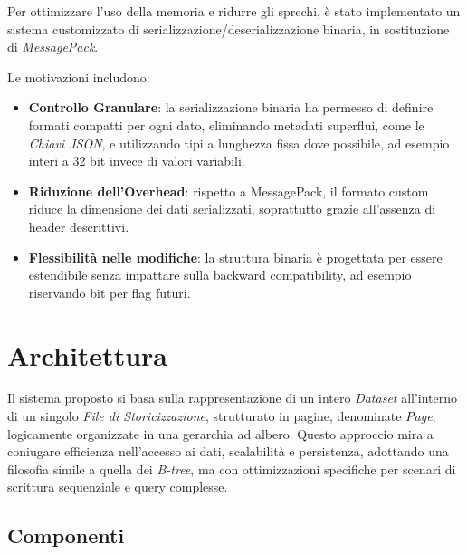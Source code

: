 \documentclass[12pt,a4paper,openright,twoside]{book}
\begin{document}
        Per ottimizzare l’uso della memoria e ridurre gli sprechi, è stato implementato un sistema customizzato di serializzazione/deserializzazione binaria, in sostituzione di \textit{MessagePack}.

        Le motivazioni includono:
        \begin{itemize}
            \item \textbf{Controllo Granulare}: la serializzazione binaria ha permesso di definire formati compatti per ogni dato, eliminando metadati superflui, come le \textit{Chiavi JSON}, e utilizzando tipi a lunghezza fissa dove possibile, ad esempio interi a 32 bit invece di valori variabili.
            \item \textbf{Riduzione dell’Overhead}: rispetto a MessagePack, il formato custom riduce la dimensione dei dati serializzati, soprattutto grazie all’assenza di header descrittivi.
            \item \textbf{Flessibilità nelle modifiche}: la struttura binaria è progettata per essere estendibile senza impattare sulla backward compatibility, ad esempio riservando bit per flag futuri.
        \end{itemize}

    \section{Architettura}

        Il sistema proposto si basa sulla rappresentazione di un intero \textit{Dataset} all’interno di un singolo \textit{File di Storicizzazione}, strutturato in pagine, denominate \textit{Page}, logicamente organizzate in una gerarchia ad albero. Questo approccio mira a coniugare efficienza nell’accesso ai dati, scalabilità e persistenza, adottando una filosofia simile a quella dei \textit{B-tree}, ma con ottimizzazioni specifiche per scenari di scrittura sequenziale e query complesse.

        \subsection{Componenti}
\end{document}
